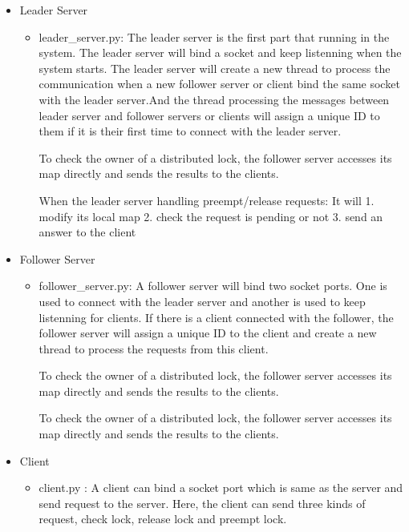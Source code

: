 \documentclass[10pt]{article}
\begin{document}
\begin{itemize}
  \item Leader Server
  \begin{itemize}
    \item leader\_server.py: The leader server is the first part that running in the system. The leader server will bind a socket and keep listenning when the system starts. The leader server will create a new thread to process the communication when a new follower server or client bind the same socket with the leader server.And the thread processing the messages between leader server and follower servers or clients will assign a unique ID to them if it is their first time to connect with the leader server.

    To check the owner of a distributed lock, the follower server accesses its map directly and sends the results to the clients.

    When the leader server handling preempt/release requests: It will 1. modify its local map 2. check the request is pending or not  3. send an answer to the client

  \end{itemize}
  \item Follower Server
  \begin{itemize}
    \item follower\_server.py: A follower server will bind two socket ports. One is used to connect with the leader server and another is used to keep listenning for clients. If there is a client connected with the follower, the follower server will assign a unique ID to the client and create a new thread to process the requests from this client.

    To check the owner of a distributed lock, the follower server accesses its map directly and sends the results to the clients.

    To check the owner of a distributed lock, the follower server accesses its map directly and sends the results to the clients.

  \end{itemize}
  \item Client
  \begin{itemize}
    \item client.py : A client can bind a socket port which is same as the server and send request to the server. Here, the client can send three kinds of request, check lock, release lock and preempt lock.
  \end{itemize}
\end{itemize}
\end{document}
